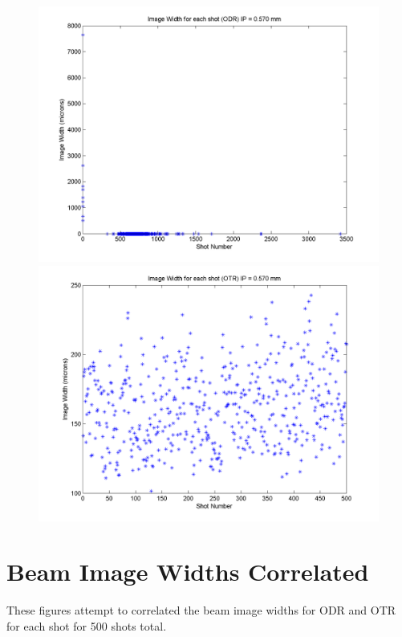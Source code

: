 \documentclass[12pt]{article}
\begin{document}
\begin{figure}
\begin{center}
\includegraphics[scale=0.5]{Figures/ImageWidth_ODR_570.PNG}
\includegraphics[scale=0.5]{Figures/ImageWidth_OTR_570.PNG}
\caption{}
\end{center}
\end{figure}



\newpage

\section{Beam Image Widths Correlated}

These figures attempt to correlated the beam image widths for ODR and OTR for each shot for 500 shots total.
\end{document}
